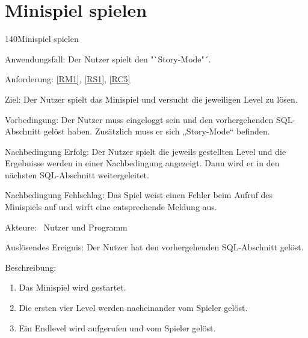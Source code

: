 \section{Minispiel spielen}
\begin{function}{140}{Minispiel spielen}
\item[Anwendungsfall:] Der Nutzer spielt den "`Story-Mode"´.
\item[Anforderung:]\ref{RM1}, \ref{RS1}, \ref{RC5}
\item[Ziel:] Der Nutzer spielt das Minispiel und versucht die jeweiligen Level zu lösen.
\item[Vorbedingung:] Der Nutzer muss eingeloggt sein und den vorhergehenden SQL-Abschnitt gelöst haben. Zusätzlich muss er sich „Story-Mode“ befinden.
\item[Nachbedingung Erfolg:]  Der Nutzer spielt die jeweils gestellten Level und die Ergebnisse werden in einer Nachbedingung angezeigt. Dann wird er in den nächsten SQL-Abschnitt weitergeleitet.
\item[Nachbedingung Fehlschlag:] Das Spiel weist einen Fehler beim Aufruf des Minispiels auf und wirft eine entsprechende Meldung aus.
\item[Akteure:] ~Nutzer und Programm
\item[Auslösendes Ereignis:] Der Nutzer hat den vorhergehenden SQL-Abschnitt gelöst.
\item[Beschreibung:] ~
\begin{enumerate}
  \item  Das Minispiel wird gestartet.
  \item  Die ersten vier Level werden nacheinander vom Spieler gelöst.
  \item Ein Endlevel wird aufgerufen und vom Spieler gelöst.
\end{enumerate}
\end{function}

